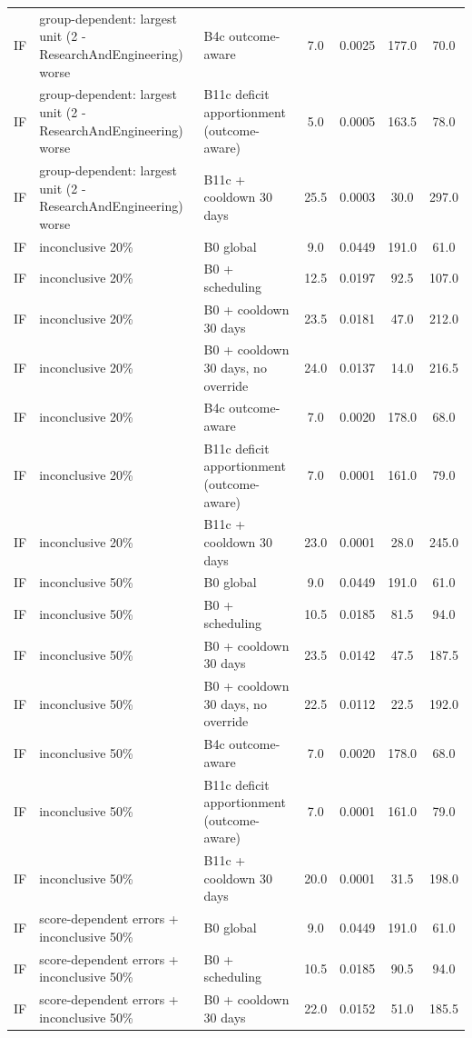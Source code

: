 \documentclass[10pt,onecolumn,letterpaper]{article}
\begin{document}
\begin{longtable}{lp{5.2cm}p{4.4cm}cccc}
IF & group-dependent: largest unit (2 - ResearchAndEngineering) worse & B4c outcome-aware & 7.0 & 0.0025 & 177.0 & 70.0 \\
IF & group-dependent: largest unit (2 - ResearchAndEngineering) worse & B11c deficit apportionment (outcome-aware) & 5.0 & 0.0005 & 163.5 & 78.0 \\
IF & group-dependent: largest unit (2 - ResearchAndEngineering) worse & B11c + cooldown 30 days & 25.5 & 0.0003 & 30.0 & 297.0 \\
IF & inconclusive 20\% & B0 global & 9.0 & 0.0449 & 191.0 & 61.0 \\
IF & inconclusive 20\% & B0 + scheduling & 12.5 & 0.0197 & 92.5 & 107.0 \\
IF & inconclusive 20\% & B0 + cooldown 30 days & 23.5 & 0.0181 & 47.0 & 212.0 \\
IF & inconclusive 20\% & B0 + cooldown 30 days, no override & 24.0 & 0.0137 & 14.0 & 216.5 \\
IF & inconclusive 20\% & B4c outcome-aware & 7.0 & 0.0020 & 178.0 & 68.0 \\
IF & inconclusive 20\% & B11c deficit apportionment (outcome-aware) & 7.0 & 0.0001 & 161.0 & 79.0 \\
IF & inconclusive 20\% & B11c + cooldown 30 days & 23.0 & 0.0001 & 28.0 & 245.0 \\
IF & inconclusive 50\% & B0 global & 9.0 & 0.0449 & 191.0 & 61.0 \\
IF & inconclusive 50\% & B0 + scheduling & 10.5 & 0.0185 & 81.5 & 94.0 \\
IF & inconclusive 50\% & B0 + cooldown 30 days & 23.5 & 0.0142 & 47.5 & 187.5 \\
IF & inconclusive 50\% & B0 + cooldown 30 days, no override & 22.5 & 0.0112 & 22.5 & 192.0 \\
IF & inconclusive 50\% & B4c outcome-aware & 7.0 & 0.0020 & 178.0 & 68.0 \\
IF & inconclusive 50\% & B11c deficit apportionment (outcome-aware) & 7.0 & 0.0001 & 161.0 & 79.0 \\
IF & inconclusive 50\% & B11c + cooldown 30 days & 20.0 & 0.0001 & 31.5 & 198.0 \\
IF & score-dependent errors + inconclusive 50\% & B0 global & 9.0 & 0.0449 & 191.0 & 61.0 \\
IF & score-dependent errors + inconclusive 50\% & B0 + scheduling & 10.5 & 0.0185 & 90.5 & 94.0 \\
IF & score-dependent errors + inconclusive 50\% & B0 + cooldown 30 days & 22.0 & 0.0152 & 51.0 & 185.5 \\

\end{longtable}
\end{document}
